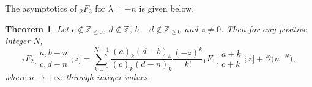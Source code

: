 \documentclass[10pt,a4paper]{amsart}
\numberwithin{equation}{section}
\newtheorem{Theorem}{Theorem}[section]
\newcommand{\ZZ}{\ensuremath{\mathbb{Z}}}
\newcommand{\mo}{\mathcal{O}}
\begin{document}
The asymptotics of $_2F_2$ for $\lambda=-n$ is given below.
\begin{Theorem}\label{Thm: 2F2 large parameter--n}
	Let $c\notin\ZZ_{\leqslant 0}$, $d\notin\ZZ$, $b-d\notin\ZZ_{\geqslant 0}$ and $z\ne 0$. Then for any positive integer $N$,
	\begin{equation}\label{2F2 large parameter--n}
		{}_2F_2\biggl[\begin{matrix}
			a,b-n\\
			c,d-n
		\end{matrix};z\biggr]=\sum_{k=0}^{N-1}\frac{(a)_k(d-b)_k}{(c)_k(d-n)_k}\frac{(-z)^k}{k!}{}_1F_1\biggl[\begin{matrix}
			a+k\\
			c+k
		\end{matrix};z\biggr]+\mo\big(n^{-N}\big),
	\end{equation}
	where $n\to +\infty$ through integer values.
\end{Theorem}
\end{document}
